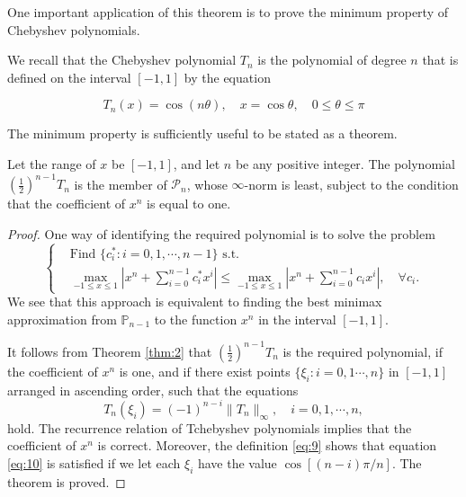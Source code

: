 \documentclass[11pt]{article}
\begin{document}
\begin{remark}
One important application of this theorem is to prove the minimum property of Chebyshev polynomials.
\end{remark}

 We recall that the Chebyshev polynomial $T_{n}$ is the polynomial of degree $n$ that is defined on the interval $[-1,1]$ by the equation


\begin{equation}
T_{n}(x)=\cos (n \theta), \quad x=\cos \theta, \quad 0 \leqslant \theta \leqslant \pi \label{eq:9}
\end{equation}


The minimum property is sufficiently useful to be stated as a theorem.

\begin{theorem} \label{thm:3}
Let the range of $x$ be $[-1,1]$, and let $n$ be any positive integer. The polynomial $\left(\frac{1}{2}\right)^{n-1} T_{n}$ is the member of $\mathscr{P}_{n}$, whose $\infty$-norm is least, subject to the condition that the coefficient of $x^{n}$ is equal to one.
\end{theorem}
\begin{proof}
One way of identifying the required polynomial is to solve the problem
$$
\left \{
    \begin{aligned}
        &\text{Find } \{c^*_i: i=0,1,\cdots,n-1\} \text{ s.t.} \\
        &\max_{-1\leqslant x \leqslant 1} \left |x^n + \sum_{i=0}^{n-1} c^*_i x^i \right | \leqslant 
        \max_{-1\leqslant x \leqslant 1} \left |x^n + \sum_{i=0}^{n-1} c_i x^i \right |,\quad \forall c_i.
    \end{aligned}
\right .
$$
We see that this approach is equivalent to finding the best minimax approximation from $\mathbb{P}_{n-1}$ to the function $x^n$ in the interval $[-1,1]$.

It follows from Theorem \ref{thm:2} that $(\frac{1}{2})^{n-1} T_n$ is the required polynomial, if the coefficient of $x^n$ is one, and if there exist points $\{\xi_i: i=0,1\cdots,n\}$ in $[-1,1]$ arranged in ascending order, such that the equations
\begin{equation}
T_n(\xi_i) = (-1)^{n-i} \|T_n\|_\infty,\quad i=0,1,\cdots,n, \label{eq:10}
\end{equation}
hold. The recurrence relation of Tchebyshev polynomials implies that the coefficient of $x^n$ is correct. Moreover, the definition \eqref{eq:9} shows that equation \eqref{eq:10} is satisfied if we let each $\xi_i$ have the value $\cos[(n-i)\pi/n]$. The theorem is proved.
\end{proof}
\end{document}

